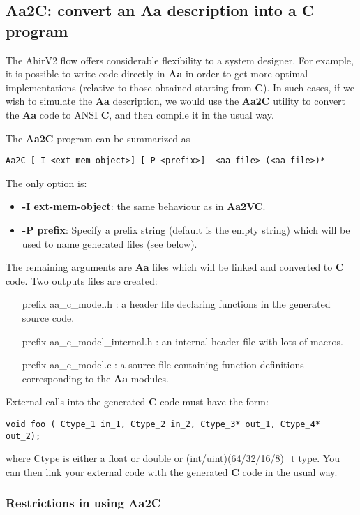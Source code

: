 \subsection{{\bf Aa2C}: convert an {\bf Aa} description into a {\bf C} program}

The AhirV2 flow offers considerable flexibility to a system designer.
For example, it is possible to write code directly in {\bf Aa} in order
to get more optimal implementations (relative to those obtained 
starting from {\bf C}).  In such cases, if we wish to simulate
the {\bf Aa} description, we would use the {\bf Aa2C} utility to
convert the {\bf Aa} code to ANSI {\bf C}, and then compile it
in the usual way.

The {\bf Aa2C} program can be summarized as
\begin{verbatim}
Aa2C [-I <ext-mem-object>] [-P <prefix>]  <aa-file> (<aa-file>)*
\end{verbatim}
The only option is:
\begin{itemize}
\item {\bf -I ext-mem-object}:  the same behaviour as in {\bf Aa2VC}.
\item {\bf -P prefix}:  Specify a prefix string (default is the empty string)
which will be used to name generated files (see below).
\end{itemize}
The remaining arguments are {\bf Aa} files which will be linked and
converted to {\bf C} code.  Two outputs files are created:
\begin{itemize}
\item [prefix]aa\_c\_model.h :  a header file declaring functions in the generated
source code.
\item [prefix]aa\_c\_model\_internal.h :  an internal header file with lots of macros.
\item [prefix]aa\_c\_model.c : a source file containing function definitions
corresponding to the {\bf Aa} modules.
\end{itemize}

External calls into the generated {\bf C} code must have the
form:
\begin{verbatim}
void foo ( Ctype_1 in_1, Ctype_2 in_2, Ctype_3* out_1, Ctype_4* out_2);
\end{verbatim}
where Ctype is either a float or double or (int/uint)(64/32/16/8)\_t type.
You can then link your external code with the generated {\bf C} code
in the usual way.

\subsubsection{Restrictions in using {\bf Aa2C}}

